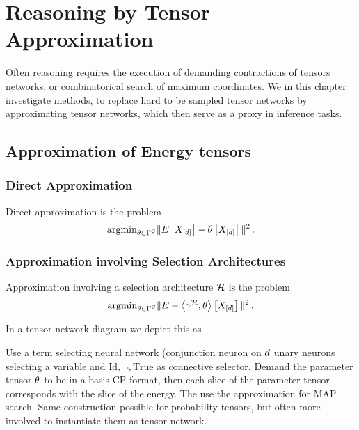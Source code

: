 \section{Reasoning by Tensor Approximation}\label{cha:tensorApproximation}

Often reasoning requires the execution of demanding contractions of tensors networks, or combinatorical search of maximum coordinates.
We in this chapter investigate methods, to replace hard to be sampled tensor networks by approximating tensor networks, which then serve as a proxy in inference tasks.


\subsection{Approximation of Energy tensors}

\subsubsection{Direct Approximation}

Direct approximation is the problem
	\[ \mathrm{argmin}_{\theta\in\Gamma^{\mathcal{G}}} \|E\left[X_{[d]}\right] - \theta\left[X_{[d]}\right]\|^2 \, . \]


\subsubsection{Approximation involving Selection Architectures}

Approximation involving a selection architecture $\mathcal{H}$ is the problem
	\[ \mathrm{argmin}_{\theta\in\Gamma^{\mathcal{G}}} \|E - \left\langle \gamma^{\mathcal{H}},\theta\right\rangle \left[ X_{[d]} \right]\|^2 \, . \]

In a tensor network diagram we depict this as
\begin{center}
    
\end{center}


\begin{example}
	Use a term selecting neural network (conjunction neuron on $d$ unary neurons selecting a variable and $\mathrm{Id},\lnot,\mathrm{True}$ as connective selector.
	Demand the parameter tensor $\theta$ to be in a basis CP format, then each slice of the parameter tensor corresponds with the slice of the energy.
	The use the approximation for MAP search.
	Same construction possible for probability tensors, but often more involved to instantiate them as tensor network.
\end{example}



